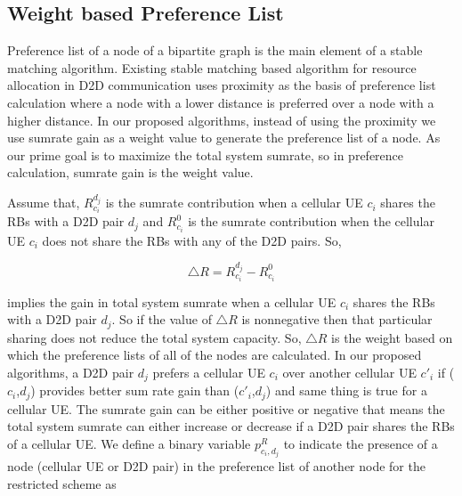 \documentclass[times]{dacauth}
\begin{document}


\subsection{Weight based Preference List} \label{preference list}


\noindent
Preference list of a node of a bipartite graph is the main element of a stable matching algorithm. Existing stable matching based algorithm \cite{dara} for resource allocation in D2D communication uses proximity as the basis of preference list calculation where a node with a lower distance is preferred over a node with a higher distance. In our proposed algorithms, instead of using the proximity we use sumrate gain as a  weight value to generate the preference list of a node. As our prime goal is to maximize the total system sumrate, so in preference calculation, sumrate gain is the weight value. 

\smallskip

\noindent
Assume that, $R_{c_i}^{d_j}$ is the sumrate contribution when a cellular UE $c_i$ shares the RBs with a D2D pair $d_j$ and $R_{c_i}^{0}$ is the sumrate contribution when the cellular UE $c_i$ does not share the RBs with any of the D2D pairs. So,



\begin{equation}
	\triangle R = R_{c_i}^{d_j}-R_{c_i}^{0} \label{eqn:sum rate increment}
\end{equation}  
       
    

\noindent
implies the gain in total system sumrate when a cellular UE $c_i$ shares the RBs with a D2D pair $d_j$. So if the value of $\triangle R$ is nonnegative then that particular sharing does not reduce the total system capacity. So, $\triangle R$ is the weight based on which the preference lists of all of the nodes are calculated. In our proposed algorithms, a D2D pair $d_j$ prefers a cellular UE $c_i$ over another cellular UE $c'_i$ if ($c_i$,$d_j$) provides better sum rate gain than ($c'_i$,$d_j$) and same thing is true for a cellular UE. The sumrate gain can be either positive or negative that means the total system sumrate can either increase or decrease if a D2D pair shares the RBs of a cellular UE. We define a binary variable $p_{c_i,d_j}^{R}$ to indicate the presence of a node (cellular UE or D2D pair) in the preference list of another node for the restricted scheme as
\end{document}
